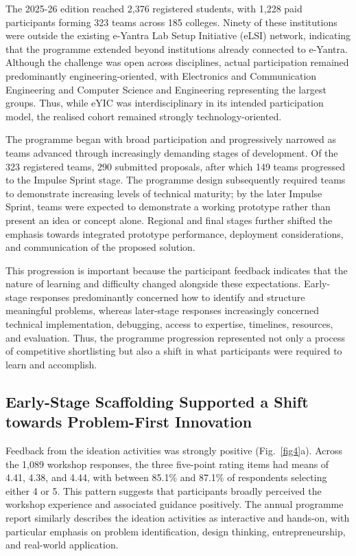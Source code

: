 \documentclass[runningheads]{llncs}
\begin{document}
The 2025-26 edition reached 2,376 registered students, with 1,228 paid participants forming 323 teams across 185 colleges. Ninety of these institutions were outside the existing e-Yantra Lab Setup Initiative (eLSI) network, indicating that the programme extended beyond institutions already connected to e-Yantra. Although the challenge was open across disciplines, actual participation remained predominantly engineering-oriented, with Electronics and Communication Engineering and Computer Science and Engineering representing the largest groups. Thus, while eYIC was interdisciplinary in its intended participation model, the realised cohort remained strongly technology-oriented.

The programme began with broad participation and progressively narrowed as teams advanced through increasingly demanding stages of development. Of the 323 registered teams, 290 submitted proposals, after which 149 teams progressed to the Impulse Sprint stage. The programme design subsequently required teams to demonstrate increasing levels of technical maturity; by the later Impulse Sprint, teams were expected to demonstrate a working prototype rather than present an idea or concept alone. Regional and final stages further shifted the emphasis towards integrated prototype performance, deployment considerations, and communication of the proposed solution.

This progression is important because the participant feedback indicates that the nature of learning and difficulty changed alongside these expectations. Early-stage responses predominantly concerned how to identify and structure meaningful problems, whereas later-stage responses increasingly concerned technical implementation, debugging, access to expertise, timelines, resources, and evaluation. Thus, the programme progression represented not only a process of competitive shortlisting but also a shift in what participants were required to learn and accomplish.

\subsection{Early-Stage Scaffolding Supported a Shift towards Problem-First Innovation}

Feedback from the ideation activities was strongly positive (Fig.~\ref{fig4}a). Across the 1,089 workshop responses, the three five-point rating items had means of 4.41, 4.38, and 4.44, with between 85.1\% and 87.1\% of respondents selecting either 4 or 5. This pattern suggests that participants broadly perceived the workshop experience and associated guidance positively. The annual programme report similarly describes the ideation activities as interactive and hands-on, with particular emphasis on problem identification, design thinking, entrepreneurship, and real-world application.
\end{document}
